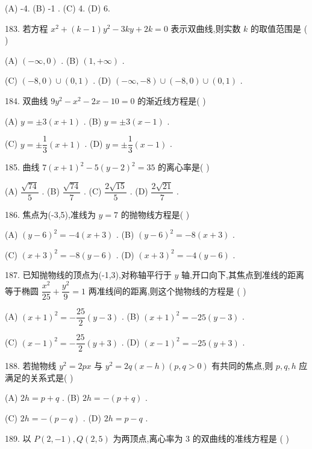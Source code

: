 (A) -4. (B) -1 . (C) 4. (D) 6.

183. 若方程 ${x}^{2} + \left( {k - 1}\right) {y}^{2} - {3ky} + {2k} = 0$ 表示双曲线,则实数 $k$ 的取值范围是 ( )

(A) $\left( {-\infty ,0}\right)$ . (B) $\left( {1, + \infty }\right)$ .

(C) $\left( {-8,0}\right)  \cup  \left( {0,1}\right)$ . (D) $\left( {-\infty , - 8}\right)  \cup  \left( {-8,0}\right)  \cup  \left( {0,1}\right)$ .

184. 双曲线 $9{y}^{2} - {x}^{2} - {2x} - {10} = 0$ 的渐近线方程是(   )

(A) $y =  \pm  3\left( {x + 1}\right)$ . (B) $y =  \pm  3\left( {x - 1}\right)$ .

(C) $y =  \pm  \dfrac{1}{3}\left( {x + 1}\right)$ . (D) $y =  \pm  \dfrac{1}{3}\left( {x - 1}\right)$ .

185. 曲线 $7{\left( x + 1\right) }^{2} - 5{\left( y - 2\right) }^{2} = {35}$ 的离心率是(   )

(A) $\dfrac{\sqrt{74}}{5}$ . (B) $\dfrac{\sqrt{74}}{7}$ . (C) $\dfrac{2\sqrt{15}}{5}$ . (D) $\dfrac{2\sqrt{21}}{7}$ .

186. 焦点为(-3,5),准线为 $y = 7$ 的抛物线方程是(   )

(A) ${\left( y - 6\right) }^{2} =  - 4\left( {x + 3}\right)$ . (B) ${\left( y - 6\right) }^{2} =  - 8\left( {x + 3}\right)$ .

(C) ${\left( x + 3\right) }^{2} =  - 8\left( {y - 6}\right)$ . (D) ${\left( x + 3\right) }^{2} =  - 4\left( {y - 6}\right)$ .

187. 已知抛物线的顶点为(-1,3),对称轴平行于 $y$ 轴,开口向下,其焦点到准线的距离等于椭圆 $\dfrac{{x}^{2}}{25} + \dfrac{{y}^{2}}{9} = 1$ 两准线间的距离,则这个抛物线的方程是 ( )

(A) ${\left( x + 1\right) }^{2} =  - \dfrac{25}{2}\left( {y - 3}\right)$ . (B) ${\left( x + 1\right) }^{2} =  - {25}\left( {y - 3}\right)$ .

(C) ${\left( x - 1\right) }^{2} =  - \dfrac{25}{2}\left( {y + 3}\right)$ . (D) ${\left( x - 1\right) }^{2} =  - {25}\left( {y + 3}\right)$ .

188. 若抛物线 ${y}^{2} = {2px}$ 与 ${y}^{2} = {2q}\left( {x - h}\right) \left( {p,q > 0}\right)$ 有共同的焦点,则 $p,q,h$ 应满足的关系式是(   )

(A) ${2h} = p + q$ . (B) ${2h} =  - \left( {p + q}\right)$ .

(C) ${2h} =  - \left( {p - q}\right)$ . (D) ${2h} = p - q$ .

189. 以 $P\left( {2, - 1}\right) ,Q\left( {2,5}\right)$ 为两顶点,离心率为 3 的双曲线的准线方程是 (   )

